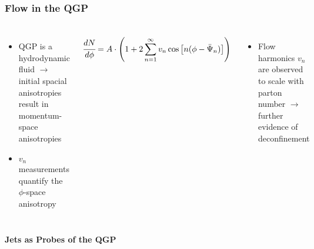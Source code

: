 \documentclass[9pt]{beamer}
\begin{document}
\begin{frame}
       
     \end{frame}

     \begin{frame}
       \frametitle{\textbf{Flow in the QGP}}
       \begin{columns}
         \begin{itemize}
         \item QGP is a hydrodynamic fluid $\to$ initial spacial anisotropies result in momentum-space anisotropies
         \item $v_n$ measurements quantify the $\phi$-space anisotropy
         \end{itemize}
         \begin{align*}
           \cfrac{dN}{d\phi} = A \cdot \left( 1 + 2\sum_{n = 1}^{\infty} v_n \cos\left[n(\phi - \bar{\Psi}_{n})\right]   \right) 
         \end{align*}
         \begin{itemize}
           \item Flow harmonics $v_n$ are observed to scale with parton number $\to$ further evidence of deconfinement
         \end{itemize}
       \end{columns}
     \end{frame}

     \begin{frame}
       \centering \textbf{Jets as Probes of the QGP}       
     \end{frame}
\end{document}
